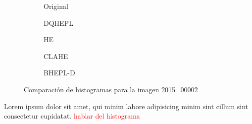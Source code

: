 \documentclass[sigchi]{acmart}
\newcommand{\rojo}[1]{\textcolor{red}{#1}}
\begin{document}
\begin{figure}[htbp]
	\centering

	\begin{subfigure}[b]{0.45\textwidth}
		\resizebox{\linewidth}{!}{}
		\caption{Original}
		\label{fig:original_1}
	\end{subfigure}
	\hfill
	\begin{subfigure}[b]{0.45\textwidth}
		\resizebox{\linewidth}{!}{}
		\caption{DQHEPL}
		\label{fig:dqhepl_1}
	\end{subfigure}

	\begin{subfigure}[b]{0.45\textwidth}
		\resizebox{\linewidth}{!}{}
		\caption{HE}
		\label{fig:he_1}
	\end{subfigure}
	\hfill
	\begin{subfigure}[b]{0.45\textwidth}
		\resizebox{\linewidth}{!}{}
		\caption{CLAHE}
		\label{fig:clahe_1}
	\end{subfigure}

	\centering
	\begin{subfigure}[b]{0.45\textwidth}
		\resizebox{\linewidth}{!}{}
		\caption{BHEPL-D}
		\label{fig:bhepl_1}
	\end{subfigure}

	\caption{Comparación de histogramas para la imagen 2015\_00002}
	\label{fig:histogramas_1}
\end{figure}

Lorem ipsum dolor sit amet, qui minim labore adipisicing minim sint cillum sint consectetur cupidatat.
\rojo{hablar del histograma}
\end{document}
